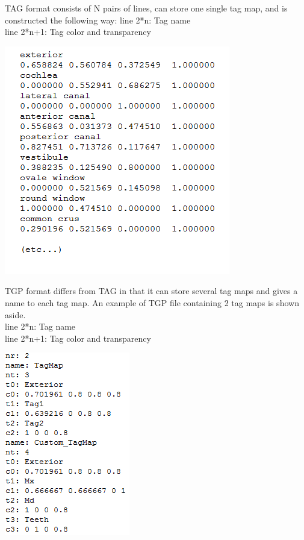 \begin{minipage}{0.55\textwidth}
TAG format consists of N pairs of lines, can store one single tag map, and is constructed the following way:
line 2*n: Tag name\\
line 2*n+1: Tag color and transparency
\end{minipage}  
 \begin{minipage}{0.45\textwidth}\centering
  \includegraphics[scale=0.5]{images/07/tagmaps/TAG_file.png}
 \end{minipage} 

\noindent

\begin{minipage}{0.55\textwidth}
TGP format differs from TAG in that it can store several tag maps and gives a name to each tag map. An example of TGP file containing 2 tag maps is shown aside.\\
line 2*n: Tag name\\
line 2*n+1: Tag color and transparency
\end{minipage}  
 \begin{minipage}{0.45\textwidth}\centering
  \includegraphics[scale=0.5]{images/07/tagmaps/TGP_file.png}
 \end{minipage} 

